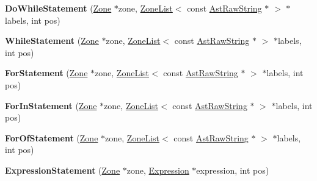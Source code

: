 \begin{DoxyCompactItemize}
\item 
\hypertarget{classv8_1_1internal_1_1_v8___f_i_n_a_l_a7f91aff932228587be8aecdf5523ffbc}{}{\bfseries Do\+While\+Statement} (\hyperlink{classv8_1_1internal_1_1_zone}{Zone} $\ast$zone, \hyperlink{classv8_1_1internal_1_1_zone_list}{Zone\+List}$<$ const \hyperlink{classv8_1_1internal_1_1_ast_raw_string}{Ast\+Raw\+String} $\ast$ $>$ $\ast$labels, int pos)\label{classv8_1_1internal_1_1_v8___f_i_n_a_l_a7f91aff932228587be8aecdf5523ffbc}

\item 
\hypertarget{classv8_1_1internal_1_1_v8___f_i_n_a_l_a24580bff331cf9b912c168a0ab1f2cb6}{}{\bfseries While\+Statement} (\hyperlink{classv8_1_1internal_1_1_zone}{Zone} $\ast$zone, \hyperlink{classv8_1_1internal_1_1_zone_list}{Zone\+List}$<$ const \hyperlink{classv8_1_1internal_1_1_ast_raw_string}{Ast\+Raw\+String} $\ast$ $>$ $\ast$labels, int pos)\label{classv8_1_1internal_1_1_v8___f_i_n_a_l_a24580bff331cf9b912c168a0ab1f2cb6}

\item 
\hypertarget{classv8_1_1internal_1_1_v8___f_i_n_a_l_ab146b5d9cb5b023d7de733a3f66b58de}{}{\bfseries For\+Statement} (\hyperlink{classv8_1_1internal_1_1_zone}{Zone} $\ast$zone, \hyperlink{classv8_1_1internal_1_1_zone_list}{Zone\+List}$<$ const \hyperlink{classv8_1_1internal_1_1_ast_raw_string}{Ast\+Raw\+String} $\ast$ $>$ $\ast$labels, int pos)\label{classv8_1_1internal_1_1_v8___f_i_n_a_l_ab146b5d9cb5b023d7de733a3f66b58de}

\item 
\hypertarget{classv8_1_1internal_1_1_v8___f_i_n_a_l_a2fe07cc6a50b33438d7fcb2cad149278}{}{\bfseries For\+In\+Statement} (\hyperlink{classv8_1_1internal_1_1_zone}{Zone} $\ast$zone, \hyperlink{classv8_1_1internal_1_1_zone_list}{Zone\+List}$<$ const \hyperlink{classv8_1_1internal_1_1_ast_raw_string}{Ast\+Raw\+String} $\ast$ $>$ $\ast$labels, int pos)\label{classv8_1_1internal_1_1_v8___f_i_n_a_l_a2fe07cc6a50b33438d7fcb2cad149278}

\item 
\hypertarget{classv8_1_1internal_1_1_v8___f_i_n_a_l_abd8ed02abd52d25b2a085d15b6554c16}{}{\bfseries For\+Of\+Statement} (\hyperlink{classv8_1_1internal_1_1_zone}{Zone} $\ast$zone, \hyperlink{classv8_1_1internal_1_1_zone_list}{Zone\+List}$<$ const \hyperlink{classv8_1_1internal_1_1_ast_raw_string}{Ast\+Raw\+String} $\ast$ $>$ $\ast$labels, int pos)\label{classv8_1_1internal_1_1_v8___f_i_n_a_l_abd8ed02abd52d25b2a085d15b6554c16}

\item 
\hypertarget{classv8_1_1internal_1_1_v8___f_i_n_a_l_aad26dd44babf29e6e56b4d84631403ee}{}{\bfseries Expression\+Statement} (\hyperlink{classv8_1_1internal_1_1_zone}{Zone} $\ast$zone, \hyperlink{classv8_1_1internal_1_1_expression}{Expression} $\ast$expression, int pos)\label{classv8_1_1internal_1_1_v8___f_i_n_a_l_aad26dd44babf29e6e56b4d84631403ee}


\end{DoxyCompactItemize}
